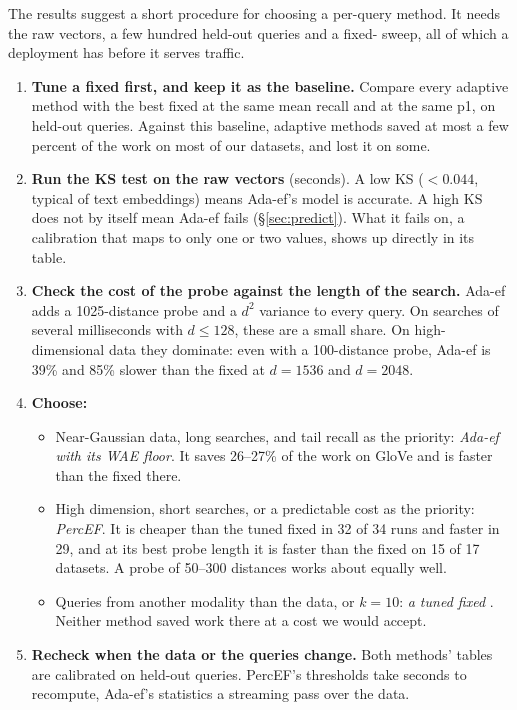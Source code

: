The results suggest a short procedure for choosing a per-query \ef{} method. It needs the raw
vectors, a few hundred held-out queries and a fixed-\ef{} sweep, all of which a deployment has
before it serves traffic.
\begin{enumerate}
\item \textbf{Tune a fixed \ef{} first, and keep it as the baseline.} Compare every adaptive method
  with the best fixed \ef{} at the same mean recall and at the same p1, on held-out queries. Against
  this baseline, adaptive methods saved at most a few percent of the work on most of our datasets,
  and lost it on some.
\item \textbf{Run the KS test on the raw vectors} (seconds). A low KS ($< 0.044$, typical of text
  embeddings) means Ada-ef's model is accurate. A high KS does not by itself mean Ada-ef fails
  (\S\ref{sec:predict}). What it fails on, a calibration that maps to only one or two \ef{} values,
  shows up directly in its table.
\item \textbf{Check the cost of the probe against the length of the search.} Ada-ef adds a
  1025-distance probe and a $d^2$ variance to every query. On searches of several milliseconds with
  $d \le 128$, these are a small share. On high-dimensional data they dominate: even with a
  100-distance probe, Ada-ef is 39\% and 85\% slower than the fixed \ef{} at $d = 1536$ and
  $d = 2048$.
\item \textbf{Choose:}
  \begin{itemize}
  \item Near-Gaussian data, long searches, and tail recall as the priority: \emph{Ada-ef with its
    WAE floor}. It saves 26--27\% of the work on GloVe and is faster than the fixed \ef{} there.
  \item High dimension, short searches, or a predictable cost as the priority: \emph{PercEF}. It is
    cheaper than the tuned fixed \ef{} in 32 of 34 runs and faster in 29, and at its best probe
    length it is faster than the fixed \ef{} on 15 of 17 datasets. A probe of 50--300 distances works
    about equally well.
  \item Queries from another modality than the data, or $k = 10$: \emph{a tuned fixed \ef{}}.
    Neither method saved work there at a cost we would accept.
  \end{itemize}
\item \textbf{Recheck when the data or the queries change.} Both methods' tables are calibrated on
  held-out queries. PercEF's thresholds take seconds to recompute, Ada-ef's statistics a streaming
  pass over the data.
\end{enumerate}
